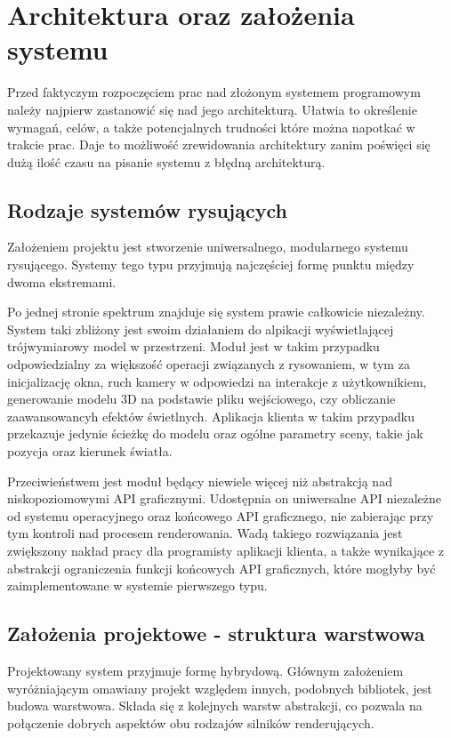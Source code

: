 \chapter{Architektura oraz założenia systemu}
Przed faktyczym rozpoczęciem prac nad złożonym systemem programowym należy najpierw zastanowić się nad jego architekturą.
Ułatwia to określenie wymagań, celów, a także potencjalnych trudności które można napotkać w trakcie prac. 
Daje to możliwość zrewidowania architektury zanim poświęci się dużą ilość czasu na pisanie systemu z błędną architekturą.

\section{Rodzaje systemów rysujących}
Założeniem projektu jest stworzenie uniwersalnego, modularnego systemu rysującego.
Systemy tego typu przyjmują najczęściej formę punktu między dwoma ekstremami. 

Po jednej stronie spektrum znajduje się system prawie całkowicie niezależny. 
System taki zbliżony jest swoim działaniem do alpikacji wyświetlającej trójwymiarowy model w przestrzeni.
Moduł jest w takim przypadku odpowiedzialny za większość operacji związanych z rysowaniem, 
    w tym za inicjalizację okna, ruch kamery w odpowiedzi na interakcje z użytkownikiem,
    generowanie modelu 3D na podstawie pliku wejściowego, czy obliczanie zaawansowancyh efektów świetlnych.
Aplikacja klienta w takim przypadku przekazuje jedynie ścieżkę do modelu oraz ogólne parametry sceny, takie jak pozycja oraz kierunek światła.

Przeciwieństwem jest moduł będący niewiele więcej niż abstrakcją nad niskopoziomowymi API graficznymi.
Udostępnia on uniwersalne API niezależne od systemu operacyjnego oraz końcowego API graficznego,
    nie zabierając przy tym kontroli nad procesem renderowania.
Wadą takiego rozwiązania jest zwiększony nakład pracy dla programisty aplikacji klienta,
    a także wynikające z abstrakcji ograniczenia funkcji końcowych API graficznych, które mogłyby być zaimplementowane w systemie pierwszego typu.

\section{Założenia projektowe - struktura warstwowa}
Projektowany system przyjmuje formę hybrydową.
Głównym założeniem wyróżniającym omawiany projekt względem innych, podobnych bibliotek, jest budowa warstwowa. 
Składa się z kolejnych warstw abstrakcji, co pozwala na połączenie dobrych aspektów obu rodzajów silników renderujących.

